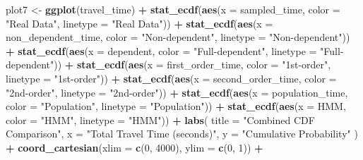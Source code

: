 \documentclass[
]{article}
\newenvironment{Shaded}{\begin{snugshade}}{\end{snugshade}}
\newcommand{\AttributeTok}[1]{\textcolor[rgb]{0.13,0.29,0.53}{#1}}
\newcommand{\DecValTok}[1]{\textcolor[rgb]{0.00,0.00,0.81}{#1}}
\newcommand{\FunctionTok}[1]{\textcolor[rgb]{0.13,0.29,0.53}{\textbf{#1}}}
\newcommand{\NormalTok}[1]{#1}
\newcommand{\OtherTok}[1]{\textcolor[rgb]{0.56,0.35,0.01}{#1}}
\newcommand{\SpecialCharTok}[1]{\textcolor[rgb]{0.81,0.36,0.00}{\textbf{#1}}}
\newcommand{\StringTok}[1]{\textcolor[rgb]{0.31,0.60,0.02}{#1}}
\begin{document}
\begin{Shaded}
\begin{Highlighting}[]
\NormalTok{plot7 }\OtherTok{\textless{}{-}} \FunctionTok{ggplot}\NormalTok{(travel\_time) }\SpecialCharTok{+}
  \FunctionTok{stat\_ecdf}\NormalTok{(}\FunctionTok{aes}\NormalTok{(}\AttributeTok{x =}\NormalTok{ sampled\_time, }\AttributeTok{color =} \StringTok{"Real Data"}\NormalTok{, }\AttributeTok{linetype =} \StringTok{"Real Data"}\NormalTok{)) }\SpecialCharTok{+}
  \FunctionTok{stat\_ecdf}\NormalTok{(}\FunctionTok{aes}\NormalTok{(}\AttributeTok{x =}\NormalTok{ non\_dependent\_time, }\AttributeTok{color =} \StringTok{"Non{-}dependent"}\NormalTok{, }\AttributeTok{linetype =} \StringTok{"Non{-}dependent"}\NormalTok{)) }\SpecialCharTok{+}
  \FunctionTok{stat\_ecdf}\NormalTok{(}\FunctionTok{aes}\NormalTok{(}\AttributeTok{x =}\NormalTok{ dependent, }\AttributeTok{color =} \StringTok{"Full{-}dependent"}\NormalTok{, }\AttributeTok{linetype =} \StringTok{"Full{-}dependent"}\NormalTok{)) }\SpecialCharTok{+}
  \FunctionTok{stat\_ecdf}\NormalTok{(}\FunctionTok{aes}\NormalTok{(}\AttributeTok{x =}\NormalTok{ first\_order\_time, }\AttributeTok{color =} \StringTok{"1st{-}order"}\NormalTok{, }\AttributeTok{linetype =} \StringTok{"1st{-}order"}\NormalTok{)) }\SpecialCharTok{+}
  \FunctionTok{stat\_ecdf}\NormalTok{(}\FunctionTok{aes}\NormalTok{(}\AttributeTok{x =}\NormalTok{ second\_order\_time, }\AttributeTok{color =} \StringTok{"2nd{-}order"}\NormalTok{, }\AttributeTok{linetype =} \StringTok{"2nd{-}order"}\NormalTok{)) }\SpecialCharTok{+}
  \FunctionTok{stat\_ecdf}\NormalTok{(}\FunctionTok{aes}\NormalTok{(}\AttributeTok{x =}\NormalTok{ population\_time, }\AttributeTok{color =} \StringTok{"Population"}\NormalTok{, }\AttributeTok{linetype =} \StringTok{"Population"}\NormalTok{)) }\SpecialCharTok{+}
  \FunctionTok{stat\_ecdf}\NormalTok{(}\FunctionTok{aes}\NormalTok{(}\AttributeTok{x =}\NormalTok{ HMM, }\AttributeTok{color =} \StringTok{"HMM"}\NormalTok{, }\AttributeTok{linetype =} \StringTok{"HMM"}\NormalTok{)) }\SpecialCharTok{+}
  \FunctionTok{labs}\NormalTok{(}
    \AttributeTok{title =} \StringTok{"Combined CDF Comparison"}\NormalTok{,}
    \AttributeTok{x =} \StringTok{"Total Travel Time (seconds)"}\NormalTok{,}
    \AttributeTok{y =} \StringTok{"Cumulative Probability"}
\NormalTok{  ) }\SpecialCharTok{+}
  \FunctionTok{coord\_cartesian}\NormalTok{(}\AttributeTok{xlim =} \FunctionTok{c}\NormalTok{(}\DecValTok{0}\NormalTok{, }\DecValTok{4000}\NormalTok{), }\AttributeTok{ylim =} \FunctionTok{c}\NormalTok{(}\DecValTok{0}\NormalTok{, }\DecValTok{1}\NormalTok{)) }\SpecialCharTok{+}

\end{Highlighting}
\end{Shaded}
\end{document}
